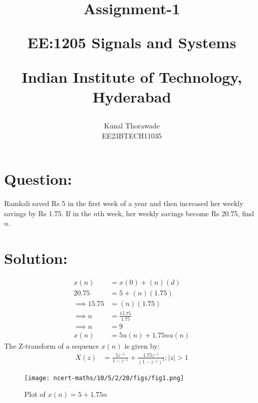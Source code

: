 \documentclass[journal,12pt,twocolumn]{IEEEtran}
\theoremstyle{remark}
\begin{document}
%




\vspace{3cm}

\title{
	Assignment-1 

	\large{EE:1205 Signals and Systems}

	Indian Institute of Technology, Hyderabad
}
\author{Kunal Thorawade

EE23BTECH11035
}	

\maketitle


\newpage


\bigskip
 
 \renewcommand{\thefigure}{\theenumi}
 \renewcommand{\thetable}{\theenumi}

 \section{\Large Question:}  Ramkali saved Rs 5 in the first week of a year and then increased her weekly savings by Rs 1.75. If in the $n$th week, her weekly savings become Rs 20.75, find $n$.

 \section{\Large Solution:} 
 \fi
 

 \begin{align} 
	 x(n) &= x(0) + (n)(d)
	 \\ 20.75 &= 5 + (n)(1.75)  
	 \\ \implies 15.75 &= (n)(1.75)
	 \\ \implies n &= \frac{15.75}{1.75}
	 \\ \implies n &= 9
	 \\x(n) &= 5u(n) + 1.75nu(n)
 \end{align}
 The Z-transform of a sequence $x(n)$ is given by:
 \begin{align}
	  X(z) &= \frac{5z^{-1}}{1-z^{-1}}+\frac{1.75z^{-1}}{(1-z^{-1})^{2}} ; |z| > 1
 \end{align}

 \begin{figure}
	     \centering
	         \texttt{[image: ncert-maths/10/5/2/20/figs/fig1.png]}
		     \caption{Plot of $x(n) = 5 + 1.75n$}
		         \label{fig:enter-label.10.5.2.20}
 \end{figure}
\end{document}
